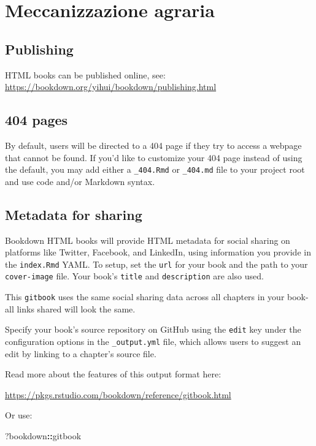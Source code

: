 \documentclass[
]{book}
\newenvironment{Shaded}{\begin{snugshade}}{\end{snugshade}}
\newcommand{\NormalTok}[1]{#1}
\newcommand{\SpecialCharTok}[1]{\textcolor[rgb]{0.81,0.36,0.00}{\textbf{#1}}}
\theoremstyle{definition}
\theoremstyle{definition}
\theoremstyle{definition}
\theoremstyle{definition}
\theoremstyle{remark}
\begin{document}
\hypertarget{meccanizzazione-agraria}{%
\chapter{Meccanizzazione agraria}\label{meccanizzazione-agraria}}

\hypertarget{publishing-2}{%
\section{Publishing}\label{publishing-2}}

HTML books can be published online, see: \url{https://bookdown.org/yihui/bookdown/publishing.html}

\hypertarget{pages-2}{%
\section{404 pages}\label{pages-2}}

By default, users will be directed to a 404 page if they try to access a webpage that cannot be found. If you'd like to customize your 404 page instead of using the default, you may add either a \texttt{\_404.Rmd} or \texttt{\_404.md} file to your project root and use code and/or Markdown syntax.

\hypertarget{metadata-for-sharing-2}{%
\section{Metadata for sharing}\label{metadata-for-sharing-2}}

Bookdown HTML books will provide HTML metadata for social sharing on platforms like Twitter, Facebook, and LinkedIn, using information you provide in the \texttt{index.Rmd} YAML. To setup, set the \texttt{url} for your book and the path to your \texttt{cover-image} file. Your book's \texttt{title} and \texttt{description} are also used.

This \texttt{gitbook} uses the same social sharing data across all chapters in your book- all links shared will look the same.

Specify your book's source repository on GitHub using the \texttt{edit} key under the configuration options in the \texttt{\_output.yml} file, which allows users to suggest an edit by linking to a chapter's source file.

Read more about the features of this output format here:

\url{https://pkgs.rstudio.com/bookdown/reference/gitbook.html}

Or use:

\begin{Shaded}
\begin{Highlighting}[]
\NormalTok{?bookdown}\SpecialCharTok{::}\NormalTok{gitbook}
\end{Highlighting}
\end{Shaded}


  
\end{document}
